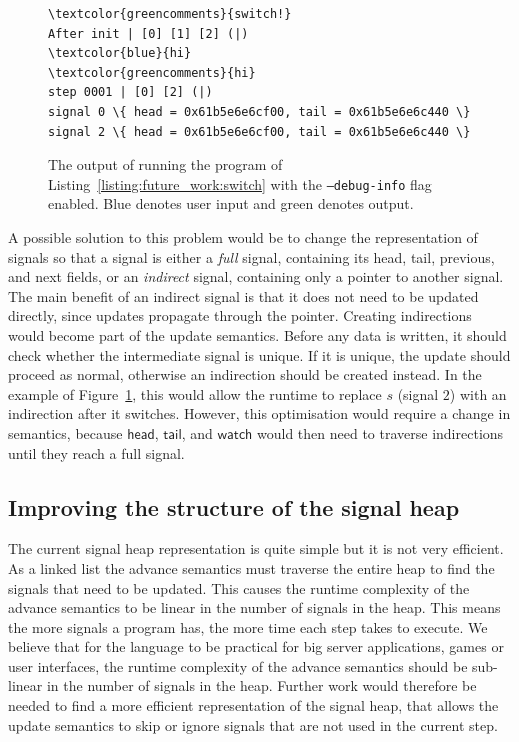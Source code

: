 \begin{figure}
\begin{Verbatim}[commandchars=\\\{\}]
\textcolor{greencomments}{switch!}
After init | [0] [1] [2] (|)
\textcolor{blue}{hi}
\textcolor{greencomments}{hi}
step 0001 | [0] [2] (|)
signal 0 \{ head = 0x61b5e6e6cf00, tail = 0x61b5e6e6c440 \}
signal 2 \{ head = 0x61b5e6e6cf00, tail = 0x61b5e6e6c440 \}
\end{Verbatim}
\caption{The output of running the program of Listing~\ref{listing:future_work:switch} with the \texttt{--debug-info} flag enabled. Blue denotes user input and green denotes output.}
\label{figure:future_work:switch_out}
\end{figure}

A possible solution to this problem would be to change the representation of signals so that a signal is either a \textit{full} signal, containing its head, tail, previous, and next fields, or an \textit{indirect} signal, containing only a pointer to another signal.
The main benefit of an indirect signal is that it does not need to be updated directly, since updates propagate through the pointer. 
Creating indirections would become part of the update semantics. Before any data is written, it should check whether the intermediate signal is unique.
If it is unique, the update should proceed as normal, otherwise an indirection should be created instead. 
In the example of Figure~\ref{figure:future_work:switch_out}, this would allow the runtime to replace $s$ (signal $2$) with an indirection after it switches.
However, this optimisation would require a change in semantics, because $\mathsf{head}$, $\mathsf{tail}$, and $\mathsf{watch}$ would then need to traverse indirections until they reach a full signal.

\subsection{Improving the structure of the signal heap}

The current signal heap representation is quite simple but it is not very efficient. As a linked list the advance semantics must traverse the entire heap to find the signals that need to be updated. This causes the runtime complexity of the advance semantics to be linear in the number of signals in the heap.
This means the more signals a program has, the more time each step takes to execute. 
We believe that for the language to be practical for big server applications, games or user interfaces, the runtime complexity of the advance semantics should be sub-linear in the number of signals in the heap. Further work would therefore be needed to find a more efficient representation of the signal heap, that allows the update semantics to skip or ignore signals that are not used in the current step.

